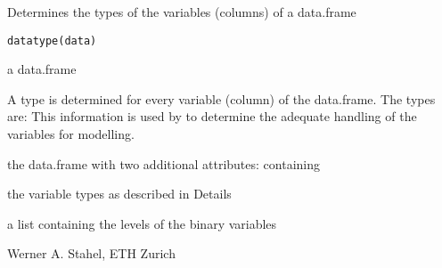 \documentclass{article}
\begin{document}
\begin{Description}\relax
Determines the types of the variables (columns) of a data.frame
\end{Description}
\begin{Usage}
\begin{verbatim}
datatype(data)
\end{verbatim}
\end{Usage}
\begin{Arguments}
\begin{ldescription}
\item[\code{data}] a data.frame
\end{ldescription}
\end{Arguments}
\begin{Details}\relax
A type is determined for every variable (column) of the data.frame.
The types are:
This information is used by  to determine the
adequate handling of the variables for modelling.
\end{Details}
\begin{Value}
the data.frame with two additional attributes: containing
\begin{ldescription}
\item[\code{vartype}] the variable types as described in Details
\item[\code{binlevels}] a list containing the levels of the binary variables
\end{ldescription}
\end{Value}
\begin{Author}\relax
Werner A. Stahel, ETH Zurich
\end{Author}
\begin{Examples}
\end{Examples}
\end{document}
